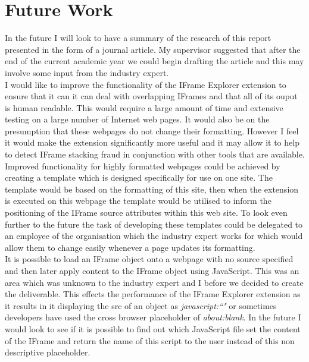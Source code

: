 \documentclass[12pt]{article}
\begin{document}
\pagebreak

\section{Future Work} \label{futureWork}
In the future I will look to have a summary of the research of this report presented in the form of a journal article. My supervisor suggested that after the end of the current academic year we could begin drafting the article and this may involve some input from the industry expert. \\

I would like to improve the functionality of the IFrame Explorer extension to ensure that it can it can deal with overlapping IFrames and that all of its ouput is human readable. This would require a large amount of time and extensive testing on a large number of Internet web pages. It would also be on the presumption that these webpages do not change their formatting. However I feel it would make the extension significantly more useful and it may allow it to help to detect IFrame stacking fraud in conjunction with other tools that are available. Improved functionality for highly formatted webpages could be achieved by creating a template which is designed specifically for use on one site. The template would be based on the formatting of this site, then when the extension is executed on this webpage the template would be utilised to inform the positioning of the IFrame source attributes within this web site. To look even further to the future the task of developing these templates could be delegated to an employee of the organisation which the industry expert works for which would allow them to change easily whenever a page updates its formatting. \\

It is possible to load an IFrame object onto a webpage with no source specified and then later apply content to the IFrame object using JavaScript. This was an area which was unknown to the industry expert and I before we decided to create the deliverable. This effects the performance of the IFrame Explorer extension as it results in it displaying the src of an object as \textit{javascript:``"} or sometimes developers have used the cross browser placeholder of \textit{about:blank}. In the future I would look to see if it is possible to find out which JavaScript file set the content of the IFrame and return the name of this script to the user instead of this non descriptive placeholder. \\
\end{document}
